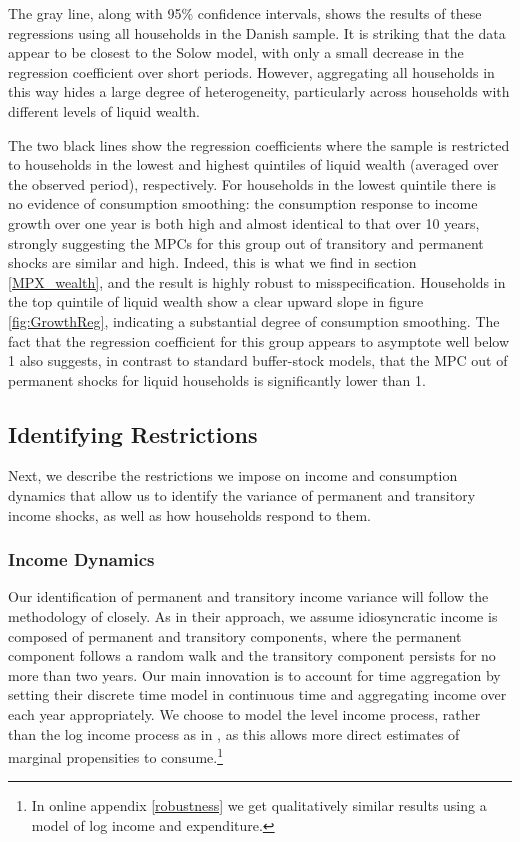 \documentclass[titlepage]{\econtex}\newcommand{\texname}{ConsumptionHeterogeneity}
\begin{document}
The gray line, along with 95\% confidence intervals, shows the results of these regressions using all households in the Danish sample. It is striking that the data appear to be closest to the Solow model, with only a small decrease in the regression coefficient over short periods. However, aggregating all households in this way hides a large degree of heterogeneity, particularly across households with different levels of liquid wealth.

The two black lines show the regression coefficients where the sample is restricted to households in the lowest and highest quintiles of liquid wealth (averaged over the observed period), respectively. For households in the lowest quintile there is no evidence of consumption smoothing: the consumption response to income growth over one year is both high and almost identical to that over 10 years, strongly suggesting the MPCs for this group out of transitory and permanent shocks are similar and high. Indeed, this is what we find in section \ref{MPX_wealth}, and the result is highly robust to misspecification. Households in the top quintile of liquid wealth show a clear upward slope in figure \ref{fig:GrowthReg}, indicating a substantial degree of consumption smoothing. The fact that the regression coefficient for this group appears to asymptote well below 1 also suggests, in contrast to standard buffer-stock models, that the MPC out of permanent shocks for liquid households is significantly lower than 1.

\subsection{Identifying Restrictions} \label{cov_restrictions}
Next, we describe the restrictions we impose on income and consumption dynamics that allow us to identify the variance of permanent and transitory income shocks, as well as how households respond to them. 

\subsubsection{Income Dynamics}
Our identification of permanent and transitory income variance will follow the methodology of \cite{carroll_nature_1997} closely. As in their approach, we assume idiosyncratic income is composed of permanent and transitory components, where the permanent component follows a random walk and the transitory component persists for no more than two years. Our main innovation is to account for time aggregation by setting their discrete time model in continuous time and aggregating income over each year appropriately. We choose to model the level income process, rather than the log income process as in \cite{carroll_nature_1997}, as this allows more direct estimates of marginal propensities to consume.\footnote{In online appendix \ref{robustness} we get qualitatively similar results using a model of log income and expenditure.}
\end{document}
